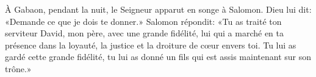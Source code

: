 À Gabaon, pendant la nuit, le Seigneur apparut en songe à Salomon.
	Dieu lui dit: «Demande ce que je dois te donner.»
Salomon répondit:
	«Tu as traité ton serviteur David, mon père, avec une grande fidélité,
	lui qui a marché en ta présence dans la loyauté, la justice
		et la droiture de cœur envers toi.
Tu lui as gardé cette grande fidélité,
	tu lui as donné un fils qui est assis maintenant sur son trône.»
